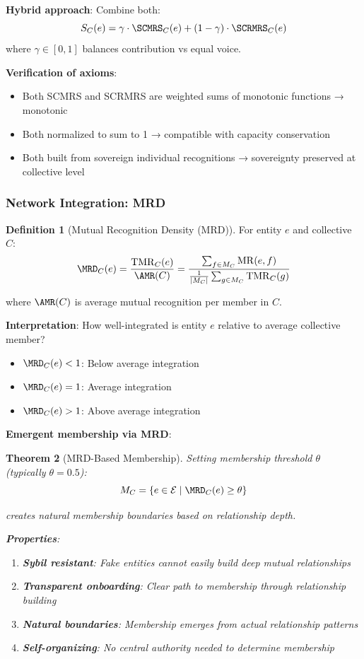 \documentclass[11pt,a4paper]{article}
\newtheorem{theorem}{Theorem}[section]
\theoremstyle{definition}
\newtheorem{definition}[theorem]{Definition}
\theoremstyle{remark}
\newcommand{\E}{\mathcal{E}}
\DeclareMathOperator{\MR}{MR}
\DeclareMathOperator{\TMR}{TMR}
\begin{document}
\textbf{Hybrid approach}: Combine both:
\[ S_C(e) = \gamma \cdot \SCMRS_C(e) + (1-\gamma) \cdot \SCRMRS_C(e) \]
where $\gamma \in [0,1]$ balances contribution vs equal voice.

\textbf{Verification of axioms}:
\begin{itemize}
\item Both SCMRS and SCRMRS are weighted sums of monotonic functions → monotonic
\item Both normalized to sum to 1 → compatible with capacity conservation
\item Both built from sovereign individual recognitions → sovereignty preserved at collective level
\end{itemize}

\subsubsection{Network Integration: MRD}

\begin{definition}[Mutual Recognition Density (MRD)]
For entity $e$ and collective $C$:
\[ \MRD_C(e) = \frac{\TMR_C(e)}{\AMR(C)} = \frac{\sum_{f \in M_C} \MR(e,f)}{\frac{1}{|M_C|}\sum_{g \in M_C} \TMR_C(g)} \]

where $\AMR(C)$ is average mutual recognition per member in $C$.

\textbf{Interpretation}: How well-integrated is entity $e$ relative to average collective member?
\begin{itemize}
\item $\MRD_C(e) < 1$: Below average integration
\item $\MRD_C(e) = 1$: Average integration
\item $\MRD_C(e) > 1$: Above average integration
\end{itemize}
\end{definition}

\textbf{Emergent membership via MRD}:

\begin{theorem}[MRD-Based Membership]
Setting membership threshold $\theta$ (typically $\theta = 0.5$):
\[ M_C = \{ e \in \E \mid \MRD_C(e) \ge \theta \} \]

creates natural membership boundaries based on relationship depth.

\textbf{Properties}:
\begin{enumerate}
\item \textbf{Sybil resistant}: Fake entities cannot easily build deep mutual relationships
\item \textbf{Transparent onboarding}: Clear path to membership through relationship building
\item \textbf{Natural boundaries}: Membership emerges from actual relationship patterns
\item \textbf{Self-organizing}: No central authority needed to determine membership
\end{enumerate}
\end{theorem}
\end{document}
